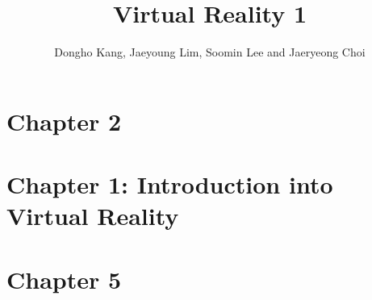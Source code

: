 \documentclass[12pt]{article}
\title{Virtual Reality 1}
\author{Dongho Kang, Jaeyoung Lim, Soomin Lee and Jaeryeong Choi}
\begin{document}
 

\maketitle

\section{Chapter 2}


\section{Chapter 1: Introduction into Virtual Reality}


\newpage


\section{Chapter 5}
\end{document}
